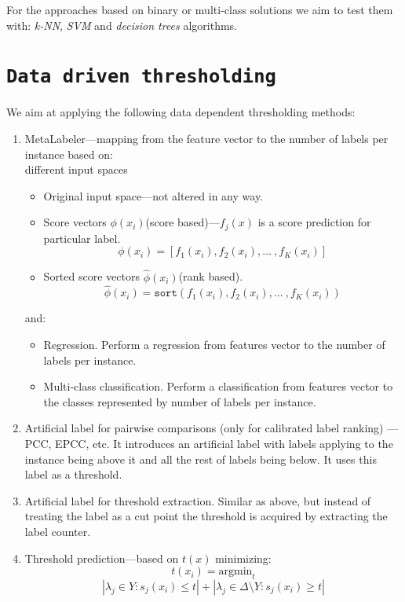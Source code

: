 \documentclass[12pt,a4paper,twocolumn]{article}
\newcommand{\ts}{\textsuperscript}
\begin{document}
For the approaches based on binary or multi-class solutions we aim to test them with: \emph{k-NN}, \emph{SVM} and \emph{decision trees} algorithms.

\section*{\texttt{Data driven thresholding}}
We aim at applying the following data dependent thresholding methods:


\begin{enumerate}
\item MetaLabeler---mapping from the feature vector to the number of labels per instance based on:\\

	different input spaces
	\begin{itemize} %
	\item Original input space---not altered in any way.
	\item Score vectors $\phi(x_i)$(score based)---$f_j(x)$ is a score prediction for particular label.
	$$
	\phi(x_i) = [ f_1(x_i), f_2(x_i), ...\ , f_K(x_i) ]
	$$
	\item Sorted score vectors $\hat{\phi}(x_i)$(rank based).
	$$
	\hat{\phi}(x_i) = \texttt{sort} ( f_1(x_i), f_2(x_i), ...\ , f_K(x_i) )
	$$
	\end{itemize}

	and:
	\begin{itemize} %
	\item Regression. Perform a regression from features vector to the number of labels per instance.
	\item Multi-class classification. Perform a classification from features vector to the classes represented by number of labels per instance.
	\end{itemize}

\item Artificial label for pairwise comparisons (only for calibrated label ranking) ---PCC, EPCC, etc. It introduces an artificial label with labels applying to the instance being above it and all the rest of labels being below. It uses this label as a threshold.
\item Artificial label for threshold extraction. Similar as above, but instead of treating the label as a cut point the threshold is acquired by extracting the label counter.%
\item Threshold prediction---based on $t(x)$ minimizing:
	$$
	t(x_i) = \text{argmin}_t $$ $$ | \lambda_j \in Y : s_j(x_i) \leq t | + | \lambda_j \in \Delta \text{\textbackslash{}} Y : s_j(x_i) \geq t |
	$$
\end{enumerate}
\end{document}
